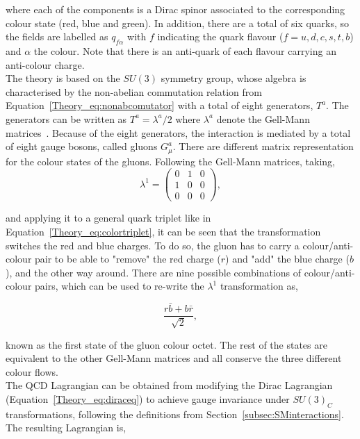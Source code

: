 where each of the components is a Dirac spinor associated to the corresponding colour state (red, blue and green).
In addition, there are a total of six quarks, so the fields are labelled as $q_{f\alpha}$ with $f$ indicating the quark flavour
($f=u,d,c,s,t,b$) and $\alpha$ the colour. Note that there is an anti-quark of each flavour carrying an anti-colour charge.\\

The theory is based on the $SU(3)$ symmetry group, whose algebra is characterised by the non-abelian commutation relation from Equation~\ref{Theory_eq:nonabcomutator}
with a total of eight generators, $T^a$. The generators can be written as $T^a=\lambda^a/2$ where $\lambda^a$
denote the Gell-Mann matrices~\cite{GellMann}.
Because of the eight generators, the interaction is mediated by a total of eight gauge bosons, called gluons $G_\mu^a$.
There are different matrix representation for the colour states of the gluons. Following the Gell-Mann matrices, taking,
\begin{equation}
\lambda^1 = \begin{pmatrix} 0 & 1 & 0 \\
1 & 0 & 0 \\
0 & 0 & 0 \end{pmatrix},
\end{equation}

and applying it to a general quark triplet like in Equation~\ref{Theory_eq:colortriplet},
it can be seen that the transformation switches the red and blue charges.
To do so, the gluon has to carry a colour/anti-colour pair to be able to "remove" the red charge ($r$) and "add" the blue charge ($b$),
and the other way around. There are nine possible combinations of colour/anti-colour pairs, which can be used to re-write the $\lambda^1$
transformation as,

\begin{equation}
\frac{r\bar{b}+b\bar{r}}{\sqrt{2}},
\end{equation}

known as the first state of the gluon colour octet. The rest of the states are equivalent to the other Gell-Mann matrices and all conserve
the three different colour flows.\\

The QCD Lagrangian can be obtained from modifying the Dirac Lagrangian (Equation~\ref{Theory_eq:diraceq})
to achieve gauge invariance under $SU(3)_C$ transformations, following the definitions from Section~\ref{subsec:SMinteractions}.
The resulting Lagrangian is,

